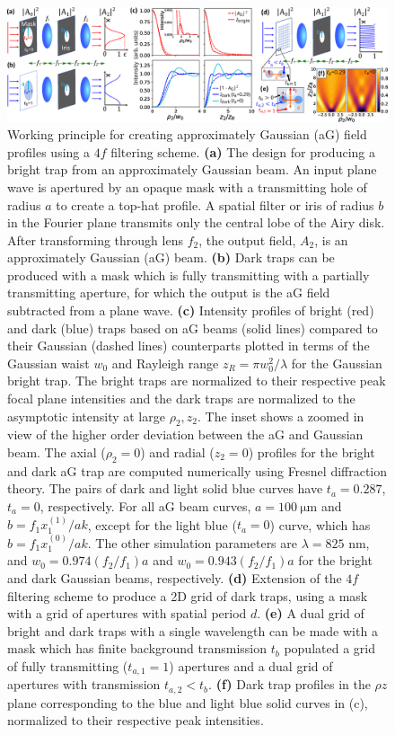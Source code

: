\begin{figure}
    \includegraphics[width=\textwidth]{Images/figure1.eps}
    \caption{Working principle for creating approximately Gaussian (aG) field profiles using a $4f$ filtering scheme. \textbf{(a)} The design for producing a bright trap from an approximately Gaussian beam. An input plane wave is apertured by an opaque mask with a transmitting hole of radius $a$ to create a top-hat profile. A spatial filter or iris of radius $b$ in the Fourier plane transmits only the central lobe of the Airy disk. After transforming through lens $f_2$, the output field, $A_2$, is an approximately Gaussian (aG) beam. \textbf{(b)} Dark traps can be produced with a mask which is fully transmitting with a partially transmitting aperture, for which the output is the aG field subtracted from a plane wave. \textbf{(c)} Intensity profiles of bright (red) and dark (blue) traps based on aG beams (solid lines) compared to their Gaussian (dashed lines) counterparts plotted in terms of the Gaussian waist $w_0$ and Rayleigh range $z_R=\pi w_0^2/\lambda$ for the Gaussian bright trap. The bright traps are normalized to their respective peak focal plane intensities and the dark traps are normalized to the asymptotic intensity at large $\rho_2,z_2$. The inset shows a zoomed in view of the higher order deviation between the aG and Gaussian beam. The axial ($\rho_2=0$) and radial ($z_2=0$) profiles for the bright and dark aG trap are computed numerically using Fresnel diffraction theory. The pairs of dark and light solid blue curves have $t_a=0.287$, $t_a=0$, respectively. For all aG beam curves,  $a=100 ~\mathrm{ \mu m}$ and $b=f_1 x_1^{(1)}/a k$, except for the light blue ($t_a=0$) curve, which has $b=f_1 x_1^{(0)}/a k$. The other simulation parameters are $\lambda=825$ nm, and $w_0=0.974(f_2/f_1)a$ and $w_0=0.943(f_2/f_1)a$ for the bright and dark Gaussian beams, respectively. \textbf{(d)} Extension of the $4f$ filtering scheme to produce a 2D grid of dark traps, using a mask with a grid of apertures with spatial period $d$. \textbf{(e)} A dual grid of bright and dark traps with a single wavelength can be made with a mask which has finite background transmission $t_b$ populated a grid of fully transmitting ($t_{a,1}=1$) apertures and a dual grid of apertures with transmission $t_{a,2} < t_b$. \textbf{(f)} Dark trap profiles in the $\rho z$ plane corresponding to the blue and light blue solid curves in (c), normalized to their respective peak intensities.}
    \label{fig:working_principle}
\end{figure}
